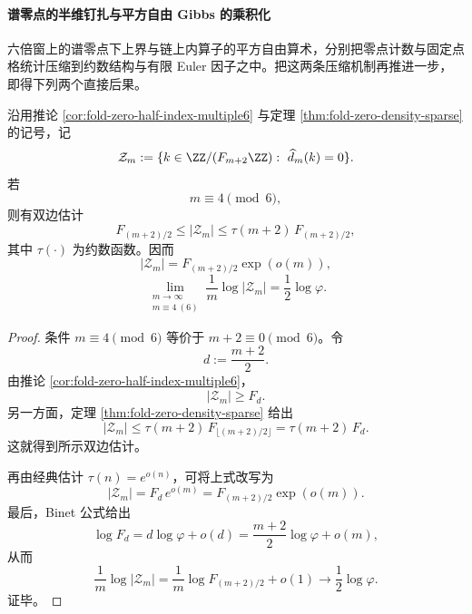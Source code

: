 \paragraph{谱零点的半维钉扎与平方自由 Gibbs 的乘积化}
六倍窗上的谱零点下上界与链上内算子的平方自由算术，分别把零点计数与固定点格统计压缩到约数结构与有限 Euler 因子之中。把这两条压缩机制再推进一步，即得下列两个直接后果。

\begin{theorem}[六倍窗谱零点集合的乘法型半维指数钉扎]\label{thm:derived-window6-zero-set-multiplicative-half-exponent}
沿用推论 \ref{cor:fold-zero-half-index-multiple6} 与定理 \ref{thm:fold-zero-density-sparse} 的记号，记
\[
\mathcal Z_m:=\{k\in \ZZ/(F_{m+2}\ZZ):\ \widehat d_m(k)=0\}.
\]
若
\[
m\equiv 4\pmod 6,
\]
则有双边估计
\[
F_{(m+2)/2}\le |\mathcal Z_m|\le \tau(m+2)\,F_{(m+2)/2},
\]
其中 \(\tau(\cdot)\) 为约数函数。因而
\[
|\mathcal Z_m|=F_{(m+2)/2}\exp(o(m)),
\]
\[
\lim_{\substack{m\to\infty\\ m\equiv 4\ (6)}}\frac1m\log|\mathcal Z_m|
=
\frac12\log\varphi.
\]
\end{theorem}
\begin{proof}
条件 \(m\equiv 4\pmod 6\) 等价于 \(m+2\equiv 0\pmod 6\)。令
\[
d:=\frac{m+2}{2}.
\]
由推论 \ref{cor:fold-zero-half-index-multiple6}，
\[
|\mathcal Z_m|\ge F_d.
\]
另一方面，定理 \ref{thm:fold-zero-density-sparse} 给出
\[
|\mathcal Z_m|
\le
\tau(m+2)\,F_{\lfloor (m+2)/2\rfloor}
=
\tau(m+2)\,F_d.
\]
这就得到所示双边估计。

再由经典估计 \(\tau(n)=e^{o(n)}\)，可将上式改写为
\[
|\mathcal Z_m|=F_d\,e^{o(m)}=F_{(m+2)/2}\exp(o(m)).
\]
最后，Binet 公式给出
\[
\log F_d=d\log\varphi+o(d)=\frac{m+2}{2}\log\varphi+o(m),
\]
从而
\[
\frac1m\log|\mathcal Z_m|
=
\frac1m\log F_{(m+2)/2}+o(1)
\longrightarrow
\frac12\log\varphi.
\]
证毕。
\end{proof}

